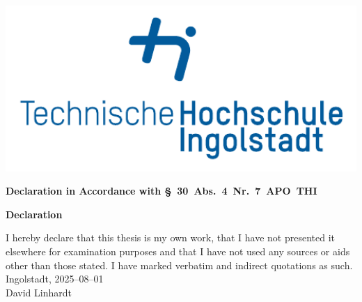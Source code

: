 \documentclass[11pt, a4paper, oneside, listof=totoc]{scrartcl}
\begin{document}
    \begin{titlepage}
        \hspace*{-1.5cm}
        \noindent
        \hfill
        \begin{minipage}{0.3\textwidth}
            \raggedleft\
            \hspace*{1cm}
            \includegraphics[width=1\textwidth]{images/thi_logo.pdf}
        \end{minipage}

        \vspace{1cm}

        \LARGE\textbf{Declaration in Accordance with §~30~Abs.~4~Nr.~7~APO~THI}\\

        \vspace{1cm}

        \hrulefill{}

        \vspace{2cm}
        
        \begin{center}
            \LARGE\textbf{Declaration}\\
        \end{center}
        \vspace{1cm}
        \normalsize
        I hereby declare that this thesis is my own work, that I have not presented it elsewhere for
        examination purposes and that I have not used any sources or aids other than those stated.
        I have marked verbatim and indirect quotations as such.\\[1cm]
        Ingolstadt, 2025--08--01\\[2cm]
        David Linhardt

    \end{titlepage}

    \restoregeometry{}

\end{document}
